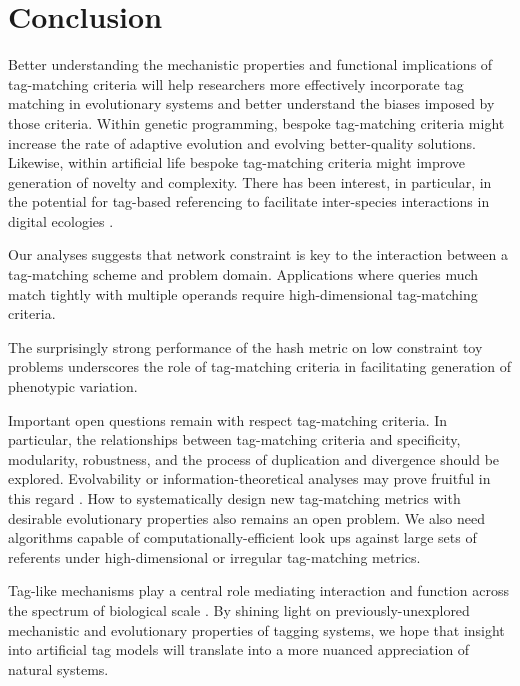 \section{Conclusion}

Better understanding the mechanistic properties and functional implications of tag-matching criteria will help researchers more effectively incorporate tag matching in evolutionary systems and better understand the biases imposed by those criteria.
Within genetic programming, bespoke tag-matching criteria might increase the rate of adaptive evolution and evolving better-quality solutions.
Likewise, within artificial life bespoke tag-matching criteria might improve generation of novelty and complexity.
There has been interest, in particular, in the potential for tag-based referencing to facilitate inter-species interactions in digital ecologies \citep{dolson2021review}.

Our analyses suggests that network constraint is key to the interaction between a tag-matching scheme and problem domain.
Applications where queries much match tightly with multiple operands require high-dimensional tag-matching criteria.

The surprisingly strong performance of the hash metric on low constraint toy problems   underscores the role of tag-matching criteria in facilitating generation of phenotypic variation.

Important open questions remain with respect tag-matching criteria.
In particular, the relationships between tag-matching criteria and specificity, modularity, robustness, and the process of duplication and divergence should be explored.
Evolvability or information-theoretical analyses may prove fruitful in this regard \citep{tarapore2015evolvability}.
How to systematically design new tag-matching metrics with desirable evolutionary properties also remains an open problem.
We also need algorithms capable of computationally-efficient look ups against large sets of referents under high-dimensional or irregular tag-matching metrics. 

Tag-like mechanisms play a central role mediating interaction and function across the spectrum of biological scale \citep{holland2012signals}.
By shining light on previously-unexplored mechanistic and evolutionary properties of tagging systems, we hope that insight into artificial tag models will translate into a more nuanced appreciation of natural systems.
